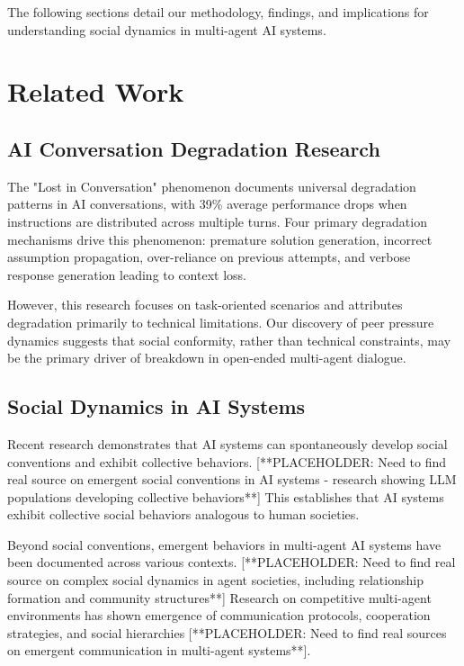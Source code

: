\documentclass[11pt,letterpaper]{article}
\begin{document}
The following sections detail our methodology, findings, and implications for understanding social dynamics in multi-agent AI systems.

\section{Related Work}

\subsection{AI Conversation Degradation Research}

The "Lost in Conversation" phenomenon \citep{laban2025lost} documents universal degradation patterns in AI conversations, with 39\% average performance drops when instructions are distributed across multiple turns. Four primary degradation mechanisms drive this phenomenon: premature solution generation, incorrect assumption propagation, over-reliance on previous attempts, and verbose response generation leading to context loss.

However, this research focuses on task-oriented scenarios and attributes degradation primarily to technical limitations. Our discovery of peer pressure dynamics suggests that social conformity, rather than technical constraints, may be the primary driver of breakdown in open-ended multi-agent dialogue.

\subsection{Social Dynamics in AI Systems}

Recent research demonstrates that AI systems can spontaneously develop social conventions and exhibit collective behaviors. [**PLACEHOLDER: Need to find real source on emergent social conventions in AI systems - research showing LLM populations developing collective behaviors**] This establishes that AI systems exhibit collective social behaviors analogous to human societies.

Beyond social conventions, emergent behaviors in multi-agent AI systems have been documented across various contexts. [**PLACEHOLDER: Need to find real source on complex social dynamics in agent societies, including relationship formation and community structures**] Research on competitive multi-agent environments has shown emergence of communication protocols, cooperation strategies, and social hierarchies [**PLACEHOLDER: Need to find real sources on emergent communication in multi-agent systems**].
\end{document}
